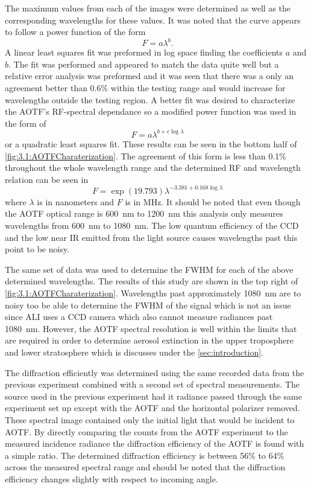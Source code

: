 \documentclass[12pt]{article}
\begin{document}
The maximum values from each of the images were determined as well as the corresponding wavelengths for these values. It was noted that the curve appears to follow a power function of the form
\begin{equation}
    \ F = a\lambda^{b}.
    \label{eqn:3.1:powerFunction}
\end{equation}
A linear least squares fit was preformed in log space finding the coefficients $a$ and $b$. The fit was performed and appeared to match the data quite well but a relative error analysis was preformed and it was seen that there was a only an agreement better than 0.6\% within the testing range and would increase for wavelengths outside the testing region. A better fit was desired to characterize the AOTF's RF-spectral dependance so a modified power function was used in the form of
 \begin{equation}
    \ F = a\lambda^{b+c\log\lambda}
    \label{eqn:3.1:modifiedPowerFunction}
\end{equation}
or a quadratic least squares fit. These results can be seen in the bottom half of \autoref{fig:3.1:AOTFCharaterization}. The agreement of this form is less than 0.1\% throughout the whole wavelength range and the determined RF and wavelength relation can be seen in
\begin{equation}
    \ F = \exp{(19.793)}\lambda^{-3.381+0.168\log\lambda}
    \label{eqn:3.1:modifiedPowerFunctionCoeffiecicents}
\end{equation}
where $\lambda$ is in nanometers and $F$ is in MHz. It should be noted that even though the AOTF optical range is 600~nm to 1200~nm this analysis only measures wavelengths from 600~nm to 1080~nm. The low quantum efficiency of the CCD and the low near IR emitted from the light source causes wavelengths past this point to be noisy.

The same set of data was used to determine the FWHM for each of the above determined wavelengths. The results of this study are shown in the top right of \autoref{fig:3.1:AOTFCharaterization}. Wavelengths past approximately 1080~nm are to noisy too be able to determine the FWHM of the signal which is not an issue since ALI uses a CCD camera which also cannot measure radiances past 1080~nm. However, the AOTF spectral resolution is well within the limits that are required in order to determine aerosol extinction in the upper troposphere and lower stratosphere which is discusses under the \autoref{sec:introduction}.

The diffraction efficiently was determined using the same recorded data from the previous experiment combined with a second set of spectral measurements. The source used in the previous experiment had it radiance passed through the same experiment set up except with the AOTF and the horizontal polarizer removed. These spectral image contained only the initial light that would be incident to AOTF. By directly comparing the counts from the AOTF experiment to the measured incidence radiance the diffraction efficiency of the AOTF is found with a simple ratio. The determined diffraction efficiency is between 56\% to 64\% across the measured spectral range and should be noted that the diffraction efficiency changes slightly with respect to incoming angle.
\end{document}
